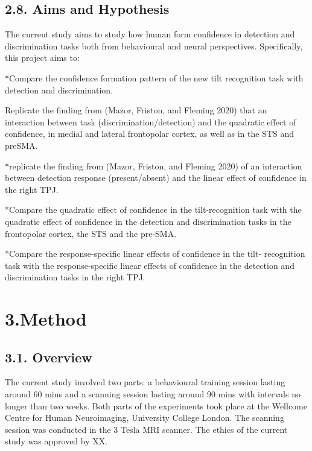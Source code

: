 \documentclass[]{article}
\begin{document}
\hypertarget{aims-and-hypothesis}{%
\subsection{2.8. Aims and Hypothesis}\label{aims-and-hypothesis}}

The current study aims to study how human form confidence in detection
and discrimination tasks both from behavioural and neural perspectives.
Specifically, this project aims to:

*Compare the confidence formation pattern of the new tilt recognition
task with detection and discrimination.

Replicate the finding from (Mazor, Friston, and Fleming 2020) that an
interaction between task (discrimination/detection) and the quadratic
effect of confidence, in medial and lateral frontopolar cortex, as well
as in the STS and preSMA.

*replicate the finding from (Mazor, Friston, and Fleming 2020) of an
interaction between detection response (present/absent) and the linear
effect of confidence in the right TPJ.

*Compare the quadratic effect of confidence in the tilt-recognition task
with the quadratic effect of confidence in the detection and
discrimination tasks in the frontopolar cortex, the STS and the pre-SMA.

*Compare the response-specific linear effects of confidence in the tilt-
recognition task with the response-specific linear effects of confidence
in the detection and discrimination tasks in the right TPJ.

\hypertarget{method}{%
\section{3.Method}\label{method}}

\hypertarget{overview}{%
\subsection{3.1. Overview}\label{overview}}

The current study involved two parts: a behavioural training session
lasting around 60 mins and a scanning session lasting around 90 mins
with intervals no longer than two weeks. Both parts of the experiments
took place at the Wellcome Centre for Human Neuroimaging, University
College London. The scanning session was conducted in the 3 Tesla MRI
scanner. The ethics of the current study was approved by XX.
\end{document}
